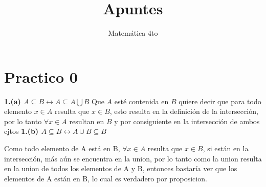 \documentclass[a4paper]{article}
\title{Apuntes}
\author{Matemática 4to}
\begin{document}
\maketitle
\section{Practico 0}
\textbf{1.(a) $A \subseteq B \longleftrightarrow A \subseteq A\bigcup B$}
Que $A$ esté contenida en $B$ quiere decir que para todo elemento $x \in A$ resulta que $x \in B$, esto resulta en la definición de la intersección, por lo tanto $\forall x \in A$ resultan en $B$ y por consiguiente en la intersección de ambos cjtos
\textbf{1.(b) $A \subseteq B \longleftrightarrow A\cup B \subseteq B$}

Como todo elemento de A está en B, $\forall x \in A$ resulta que $x \in B$, si están en la intersección, más aún se encuentra en la union, por lo tanto como la union resulta en la union de todos los elementos de A y B, entonces bastaría ver que los elementos de A están en B, lo cual es verdadero por proposicion.
\end{document}

